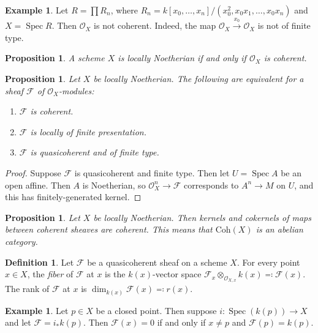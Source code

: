 \documentclass[leqno, openany]{memoir}
\newtheorem{prop}[thm]{Proposition}
\theoremstyle{definition}
\newtheorem{defn}[thm]{Definition}
\newtheorem{exm}[thm]{Example}
\theoremstyle{remark}
\theoremstyle{plain}
\theoremstyle{definition}
\theoremstyle{remark}
\newcommand{\mr}[1]{\mathrm{#1}}
\newcommand{\msc}[1]{\mathscr{#1}}
\DeclareMathOperator{\Spec}{Spec}
\begin{document}
\begin{exm}
    Let $R = \prod R_n$, where $R_n = k[x_0, \ldots, x_n] / (x_0^2, x_0 x_1, \ldots, x_0 x_n)$ and $X = \Spec R$. Then $\msc{O}_X$ is not coherent. Indeed, the map $\msc{O}_X \xrightarrow{x_0} \msc{O}_X$ is not of finite type.
\end{exm}

\begin{prop}
    A scheme $X$ is locally Noetherian if and only if $\msc{O}_X$ is coherent.
\end{prop}

\begin{prop}
    Let $X$ be locally Noetherian. The following are equivalent for a sheaf $\msc{F}$ of $\msc{O}_X$-modules:
    \begin{enumerate}
        \item $\msc{F}$ is coherent.
        \item $\msc{F}$ is locally of finite presentation.
        \item $\msc{F}$ is quasicoherent and of finite type.
    \end{enumerate}
\end{prop}

\begin{proof}
    Suppose $\msc{F}$ is quasicoherent and finite type. Then let $U = \Spec A$ be an open affine. Then $A$ is Noetherian, so $\msc{O}_X^n \to \msc{F}$ corresponds to $A^n \to M$ on $U$, and this has finitely-generated kernel.
\end{proof}

\begin{prop}
    Let $X$ be locally Noetherian. Then kernels and cokernels of maps between coherent sheaves are coherent. This means that $\mr{Coh}(X)$ is an abelian category.
\end{prop}

\begin{defn}
    Let $\msc{F}$ be a quasicoherent sheaf on a scheme $X$. For every point $x \in X$, the \textit{fiber} of $\msc{F}$ at $x$ is the $k(x)$-vector space $\msc{F}_x \otimes_{\msc{O}_{X,x}} k(x) \eqqcolon \msc{F}(x)$. The rank of $\msc{F}$ at $x$ is $\dim_{k(x)} \msc{F}(x) \eqqcolon r(x)$.
\end{defn}

\begin{exm}
    Let $p \in X$ be a closed point. Then suppose $i \colon \Spec (k(p)) \to X$ and let $\msc{F}  = i_* k(p)$. Then $\msc{F}(x) = 0$ if and only if $x \neq p$ and $\msc{F}(p) = k(p)$.
\end{exm}
\end{document}
